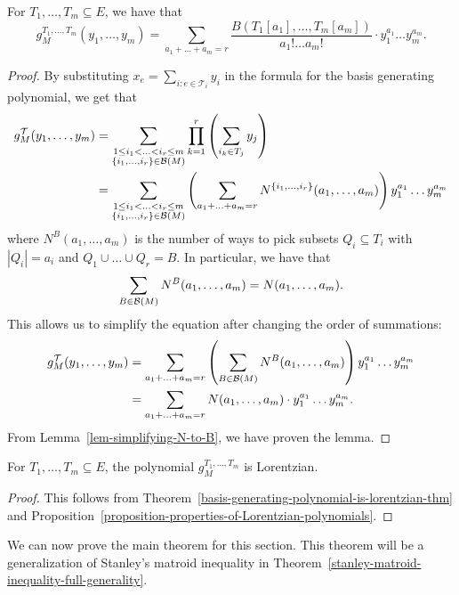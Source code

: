 \documentclass{puthesis-UG}
\begin{document}
\begin{prop}
	For $T_1, \ldots, T_m \subseteq E$, we have that 
	\[	
		g_M^{T_1, \ldots, T_m} (y_1, \ldots, y_m) = \sum_{a_1 + \ldots + a_m = r} \frac{B(T_1[a_1], \ldots, T_m[a_m])}{a_1! \ldots a_m!} \cdot y_1^{a_1} \ldots y_m^{a_m}.
	\]
\end{prop}

\begin{proof}
	By substituting $x_e = \sum_{i : e \in \mathcal{T}_i} y_i$ in the formula for the basis generating polynomial, we get that 
	\begin{align*}
		g_M^{\mathcal{T}}(y_1, \ldots, y_m) & = \sum_{\substack{1 \leq i_1 < \ldots < i_r \leq m \\ \{i_1, \ldots, i_r\} \in \mathcal{B}(M)}} \prod_{k = 1}^r \left ( \sum_{i_k \in T_j} y_j \right ) \\
		& = \sum_{\substack{1 \leq i_1 < \ldots < i_r \leq m \\ \{i_1, \ldots, i_r\} \in \mathcal{B}(M)}} \left (\sum_{a_1 + \ldots + a_m = r} N^{\{i_1, \ldots, i_r\}}(a_1, \ldots, a_m) \right ) y_1^{a_1} \ldots y_m^{a_m}
	\end{align*}
	where $N^B(a_1, \ldots, a_m)$ is the number of ways to pick subsets $Q_i \subseteq T_i$ with $|Q_i| = a_i$ and $Q_1 \cup \ldots \cup Q_r = B$. In particular, we have that 
	\[	
		\sum_{B \in \mathcal{B}(M)} N^B (a_1, \ldots, a_m) = N(a_1, \ldots, a_m). 
	\]
	This allows us to simplify the equation after changing the order of summations: 
	\begin{align*}
		g_M^{\mathcal{T}}(y_1, \ldots, y_m) & = \sum_{a_1 + \ldots + a_m = r} \left ( \sum_{B \in \mathcal{B}(M)} N^B (a_1, \ldots, a_m) \right ) y_1^{a_1} \ldots y_m^{a_m} \\
		& = \sum_{a_1 + \ldots + a_m = r} N(a_1, \ldots, a_m) \cdot y_1^{a_1} \ldots y_m^{a_m}.
	\end{align*}
	From Lemma~\ref{lem-simplifying-N-to-B}, we have proven the lemma. 
\end{proof}

\begin{lem}
	For $T_1, \ldots, T_m \subseteq E$, the polynomial $g_M^{T_1, \ldots, T_m}$ is Lorentzian. 
\end{lem}
\begin{proof}
	This follows from Theorem~\ref{basis-generating-polynomial-is-lorentzian-thm} and Proposition~\ref{proposition-properties-of-Lorentzian-polynomials}. 
\end{proof}

We can now prove the main theorem for this section. This theorem will be a generalization of Stanley's matroid inequality in Theorem~\ref{stanley-matroid-inequality-full-generality}. 
\end{document}
